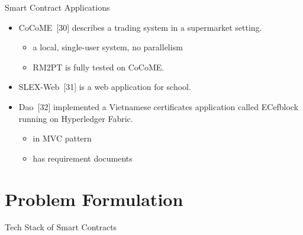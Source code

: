 \documentclass[xcolor=svgnames]{beamer}
\begin{document}
\begin{frame}{Smart Contract Applications}
\begin{itemize}
\item CoCoME~[30] describes a trading system in a supermarket setting.
	\begin{itemize}
	\item a local, single-user system, no parallelism
	\item RM2PT is fully tested on CoCoME.
	\end{itemize}

\item SLEX-Web~[31] is a web application for school.
\item Dao~[32] implemented a Vietnamese certificates application called ECefblock running on Hyperledger Fabric.
	\begin{itemize}
	\item in MVC pattern
	\item has requirement documents
	\end{itemize}
\end{itemize}
\end{frame}

\section{Problem Formulation}

\begin{frame}{Tech Stack of Smart Contracts}



\end{frame}
\end{document}
